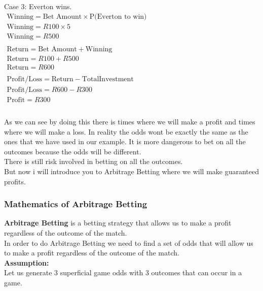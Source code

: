 Case 3: Everton wins. \\

\begin{math}
\begin{array}{l}
\text{Winning} = \text{Bet Amount} \times \text{P(Everton to win)} \\
\text{Winning} = R100 \times 5 \\
\text{Winning} = R500 \\
\\
\text{Return} = \text{Bet Amount} + \text{Winning} \\
\text{Return} = R100 + R500 \\
\text{Return} = R600 \\
\\
\text{Profit/Loss} = \text{Return} - \text{TotalInvestment} \\
\text{Profit/Loss} = R600 - R300 \\
\text{Profit} = R300 \\
\\
\end{array}
\end{math}

As we can see by doing this there is times where we will make a profit and times where we will make a loss. In reality the odds wont be exactly the same as the ones that we have used in our example. It is more dangerous to bet on all the outcomes because the odds will be different. \\
There is still risk involved in betting on all the outcomes. \\
But now i will introduce you to Arbitrage Betting where we will make guaranteed profits. \\

\subsubsection{Mathematics of Arbitrage Betting}

\textbf{Arbitrage Betting} is a betting strategy that allows us to make a profit regardless of the outcome of the match. \\

In order to do Arbitrage Betting we need to find a set of odds that will allow us to make a profit regardless of the outcome of the match. \\

\textbf{Assumption:} \\

Let us generate 3 superficial game odds with 3 outcomes that can occur in a game. \\

